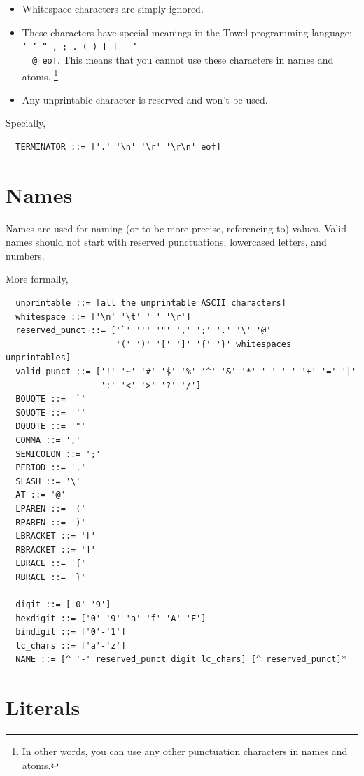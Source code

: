 \documentclass{book}
\begin{document}
\begin{itemize}
\item Whitespace characters are simply ignored.
\item These characters have special meanings in the Towel programming language: \texttt{` ' `` , ; . ( ) [ ] { } \char`\\ ~  @ eof}. This means that you cannot use these characters in names and atoms. \footnote{In other words, you can use any other punctuation characters in names and atoms.}
\item Any unprintable character is reserved and won't be used.
\end{itemize}

Specially,
\begin{verbatim}
  TERMINATOR ::= ['.' '\n' '\r' '\r\n' eof]
\end{verbatim}

\section{Names}

Names are used for naming (or to be more precise, referencing to) values. Valid names should not start with reserved punctuations, lowercased letters, and numbers.

More formally,
\begin{verbatim}
  unprintable ::= [all the unprintable ASCII characters]
  whitespace ::= ['\n' '\t' ' ' '\r']
  reserved_punct ::= ['`' ''' '"' ',' ';' '.' '\' '@' 
                      '(' ')' '[' ']' '{' '}' whitespaces unprintables]
  valid_punct ::= ['!' '~' '#' '$' '%' '^' '&' '*' '-' '_' '+' '=' '|'
                   ':' '<' '>' '?' '/']
  BQUOTE ::= '`'
  SQUOTE ::= '''
  DQUOTE ::= '"'
  COMMA ::= ','
  SEMICOLON ::= ';'
  PERIOD ::= '.'
  SLASH ::= '\'
  AT ::= '@'
  LPAREN ::= '('
  RPAREN ::= ')'
  LBRACKET ::= '['
  RBRACKET ::= ']'
  LBRACE ::= '{'
  RBRACE ::= '}'

  digit ::= ['0'-'9']
  hexdigit ::= ['0'-'9' 'a'-'f' 'A'-'F']
  bindigit ::= ['0'-'1']
  lc_chars ::= ['a'-'z']
  NAME ::= [^ '-' reserved_punct digit lc_chars] [^ reserved_punct]*
\end{verbatim}

\section{Literals}
\end{document}
